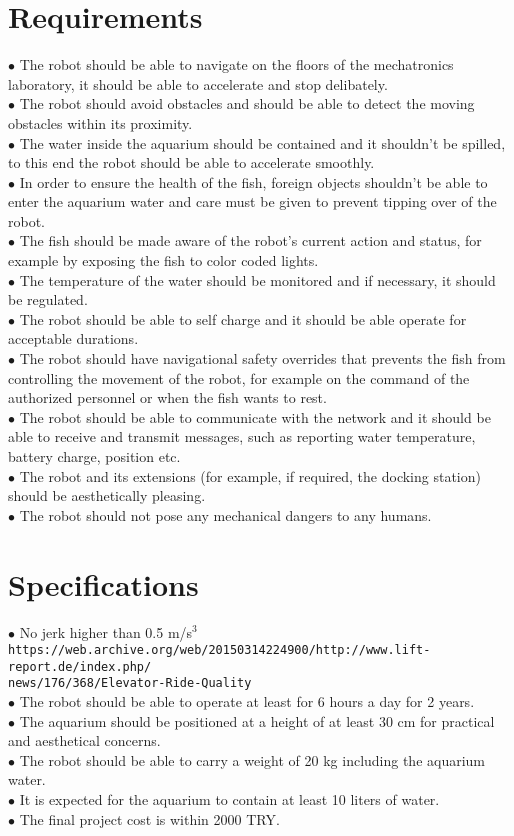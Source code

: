 \documentclass[12pt]{article}
\begin{document}
	\section{Requirements}
	$\bullet$ The robot should be able to navigate on the floors of the mechatronics laboratory, it should be able to accelerate and stop delibately.\\
	$\bullet$ The robot should avoid obstacles and should be able to detect the moving obstacles within its proximity.\\
	$\bullet$ The water inside the aquarium should be contained and it shouldn't be spilled, to this end the robot should be able to accelerate smoothly.\\
	$\bullet$ In order to ensure the health of the fish, foreign objects shouldn't be able to enter the aquarium water and care must be given to prevent tipping over of the robot.\\
	$\bullet$ The fish should be made aware of the robot's current action and status, for example by exposing the fish to color coded lights.\\ 
	$\bullet$ The temperature of the water should be monitored and if necessary, it should be regulated.\\
	$\bullet$ The robot should be able to self charge and it should be able operate for acceptable durations.\\
	$\bullet$ The robot should have navigational safety overrides that prevents the fish from controlling the movement of the robot, for example on the command of the authorized personnel or when the fish wants to rest.\\
	$\bullet$ The robot should be able to communicate with the network and it should be able to receive and transmit messages, such as reporting water temperature, battery charge, position etc.\\
	$\bullet$ The robot and its extensions (for example, if required, the docking station) should be aesthetically pleasing.\\
	$\bullet$ The robot should not pose any mechanical dangers to any humans.\\
	\section{Specifications}
	$\bullet $ No jerk higher than 0.5 m/s$^3$\\
	\texttt{https://web.archive.org/web/20150314224900/http://www.lift-report.de/index.php/\\news/176/368/Elevator-Ride-Quality}\\
	$\bullet$ The robot should be able to operate at least for 6 hours a day for 2 years.\\
	$\bullet$ The aquarium should be positioned at a height of at least 30 cm for practical and aesthetical concerns.\\
	$\bullet$ The robot should be able to carry a weight of 20 kg including the aquarium water.\\
	$\bullet$ It is expected for the aquarium to contain at least 10 liters of water.\\
	$\bullet$ The final project cost is within 2000 TRY.
\end{document}
